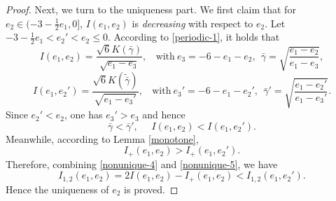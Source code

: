 \documentclass[reqno,12pt]{amsart}
\begin{document}
\begin{proof}
 Next, we turn to the uniqueness part. We first claim that
   for $  e_2 \in(-3-\frac12 e_1,0]$, $I(e_1, e_2) $ is
  \emph{decreasing} with respect to $e_2$.  
    Let $-3-\frac12 e_1< {{e}}_2' < e_2 \leq 0$.
    According to \eqref{periodic-1}, it holds that 
    \begin{equation}\nonumber
    I(e_1, e_2) = \frac{\sqrt{6} K ( \bar{\gamma})}{\sqrt{e_1 - e_3}}, \ \ \ \ \mbox{with}\ e_3 = -6-e_1-e_2, \ \  \bar{\gamma} =\sqrt{\frac{e_1-e_2}{e_1 -e_3}}, 
    \end{equation}
    \begin{equation}\nonumber
     I (e_1, {e}_2') = \frac{\sqrt{6} K (\tilde{ \bar{\gamma}})}{\sqrt{e_1 - {e}_3'}}, \ \ \ \ \mbox{with}\ {e}_3' = -6-e_1-{e}_2', \ \ { \bar{\gamma}'} =\sqrt{\frac{e_1-{e}_2'}{e_1 -{e}_3'}}.
    \end{equation}
     Since ${e}_2'<e_2$, one has ${e}_3'> e_3$ and hence 
    \begin{equation}\label{nonunique-4}
      \bar{\gamma} < { \bar{\gamma}'}, \ \ \ \ \  \    I(e_1, e_2) <I(e_1, {e}_2').
    \end{equation} 
   Meanwhile, according to Lemma \ref{monotone}, 
   \begin{equation}\label{nonunique-5}
       I_{+}(e_1, e_2)> I_{+}(e_1, {e}_2'). 
   \end{equation}
    Therefore, combining \eqref{nonunique-4} and \eqref{nonunique-5}, we have
    \begin{equation}
    \label{eq1859}
        I_{1, 2}(e_1, e_2) = 2I(e_1, e_2) - I_{+}(e_1, e_2) < I_{1, 2}(e_1, {e}_2').
    \end{equation} 
    Hence the uniqueness of $e_2$ is proved. 
\end{proof}
\end{document}
